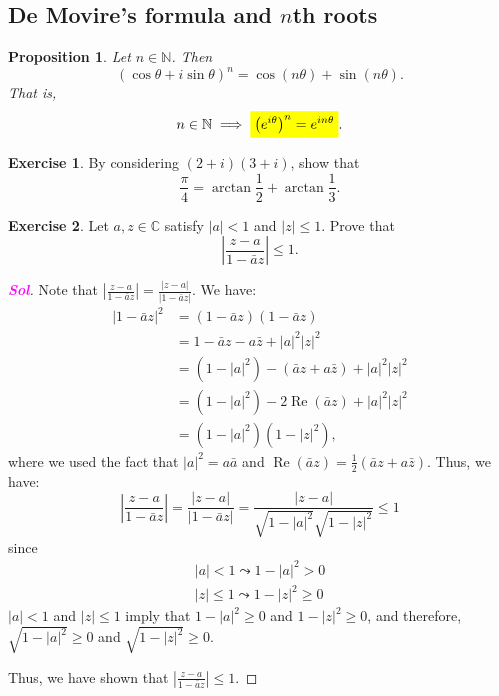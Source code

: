 \documentclass[12pt,openany]{book}
\newcommand{\mathcolorbox}[2]{\colorbox{#1}{$\displaystyle #2$}}
\newtheorem{proposition}[theorem]{Proposition}
\theoremstyle{definition}
\newtheorem{exercise}{Exercise}[section]
\newcommand{\N}{\mathbb{N}}
\newcommand{\C}{\mathbb{C}}
\newcommand{\of}[1]{\left( #1 \right)}
\newcommand{\abs}[1]{\left\lvert #1 \right\rvert}
\newcommand{\sol}{\textcolor{magenta}{\bf Sol}}
\renewcommand{\Re}{\operatorname{Re}}
\begin{document}
	\subsection{De Movire's formula and $n$th roots}
	\begin{tcolorbox}[title=De Moivre's Formula]
		\begin{proposition}
			Let $n\in\N$. Then \[
			\of{\cos\theta+i\sin\theta}^n=\cos(n\theta)+\sin(n\theta).
			\]  That is, \[
			n\in\N\implies \mathcolorbox{-blue}{\of{e^{i\theta}}^n=e^{in\theta}}.
			\]
		\end{proposition}
	\end{tcolorbox}
	
	\begin{exercise}
		By considering $(2+i)(3+i)$, show that \[
		\frac{\pi}{4}=\arctan\frac{1}{2}+\arctan\frac{1}{3}.
		\]
	\end{exercise}
	
	\begin{exercise}
		Let $a,z\in\C$ satisfy $\abs{a}<1$ and $\abs{z}\leq 1$. Prove that \[
		\abs{\frac{z-a}{1-\bar{a}z}}\leq 1.
		\] \begin{proof}[\sol]
			Note that $\abs{\frac{z-a}{1-\bar{a}z}} = \frac{\abs{z-a}}{\abs{1-\bar{a}z}}$. We have:
			\begin{align*}
				\abs{1-\bar{a}z}^2 &= (1-\bar{a}z)(1-\bar{a}z) \\
				&= 1 - \bar{a}z - a\bar{z} + \abs{a}^2 \abs{z}^2 \\
				&= (1-\abs{a}^2) - (\bar{a}z + a\bar{z}) + \abs{a}^2 \abs{z}^2 \\
				&= (1-\abs{a}^2) - 2\Re(\bar{a}z) + \abs{a}^2 \abs{z}^2 \\
				&= (1-\abs{a}^2)(1-\abs{z}^2),
			\end{align*} where we used the fact that $\abs{a}^2 = a\bar{a}$ and $\Re(\bar{a}z) = \frac{1}{2}(\bar{a}z + a\bar{z})$. Thus, we have:
			$$\abs{\frac{z-a}{1-\bar{a}z}} = \frac{\abs{z-a}}{\abs{1-\bar{a}z}} = \frac{\abs{z-a}}{\sqrt{1-\abs{a}^2}\sqrt{1-\abs{z}^2}} \leq 1$$
			since \begin{align*}
				\abs{a}<1\leadsto 1-\abs{a}^2> 0 \\
				\abs{z}\leq 1\leadsto 1-\abs{z}^2\geq 0
			\end{align*}$\abs{a}<1$ and $\abs{z}\leq 1$ imply that $1-\abs{a}^2\geq 0$ and $1-\abs{z}^2\geq 0$, and therefore, $\sqrt{1-\abs{a}^2}\geq 0$ and $\sqrt{1-\abs{z}^2}\geq 0$.
			
			Thus, we have shown that $\abs{\frac{z-a}{1-\bar{a}z}}\leq 1$.
		\end{proof}
	\end{exercise}
	
\end{document}
